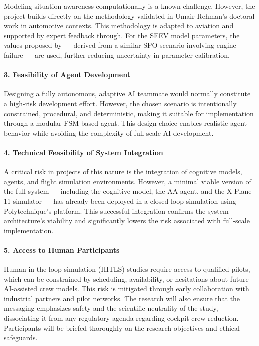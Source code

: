 \documentclass[12pt,a4paper]{article} %
\begin{document}
	Modeling situation awareness computationally is a known challenge. However, the project builds directly on the methodology validated in Umair Rehman's doctoral work in automotive contexts. This methodology is adapted to aviation and supported by expert feedback through. For the SEEV model parameters, the values proposed by \parencite{wang_real-time_2024} — derived from a similar SPO scenario involving engine failure — are used, further reducing uncertainty in parameter calibration.

	\paragraph{3. Feasibility of Agent Development}

	Designing a fully autonomous, adaptive AI teammate would normally constitute a high-risk development effort. However, the chosen scenario is intentionally constrained, procedural, and deterministic, making it suitable for implementation through a modular FSM-based agent. This design choice enables realistic agent behavior while avoiding the complexity of full-scale AI development.

	\paragraph{4. Technical Feasibility of System Integration}

	A critical risk in projects of this nature is the integration of cognitive models, agents, and flight simulation environments. However, a minimal viable version of the full system — including the cognitive model, the AA agent, and the X-Plane 11 simulator — has already been deployed in a closed-loop simulation using Polytechnique's platform. This successful integration confirms the system architecture's viability and significantly lowers the risk associated with full-scale implementation.

	\paragraph{5. Access to Human Participants}

	Human-in-the-loop simulation (HITLS) studies require access to qualified pilots, which can be constrained by scheduling, availability, or hesitations about future AI-assisted crew models. This risk is mitigated through early collaboration with industrial partners and pilot networks. The research will also ensure that the messaging emphasizes safety and the scientific neutrality of the study, dissociating it from any regulatory agenda regarding cockpit crew reduction. Participants will be briefed thoroughly on the research objectives and ethical safeguards.
\end{document}

